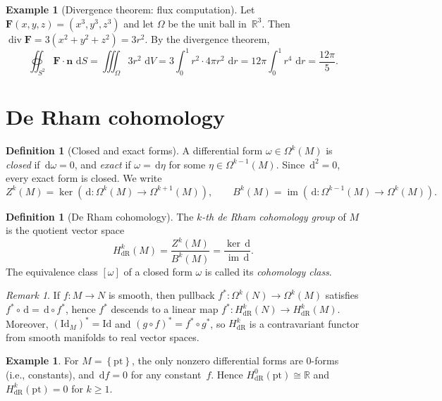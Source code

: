 \documentclass[12pt,a4paper,openany]{book}
\theoremstyle{definition}
\newtheorem{definition}[theorem]{Definition}
\newtheorem{example}[theorem]{Example}
\theoremstyle{remark}
\newtheorem{remark}[theorem]{Remark}
\newcommand{\R}{\mathbb{R}}
\newcommand{\Id}{\mathrm{Id}}
\DeclareMathOperator{\im}{im}
\newcommand{\dd}{\,\mathrm{d}}
\newcommand{\set}[1]{\left\{ #1 \right\}}
\begin{document}
\begin{example}[Divergence theorem: flux computation]\label{ex:divergence-flux}
Let $\mathbf{F}(x,y,z) = (x^3, y^3, z^3)$ and let $\Omega$ be the unit
ball in~$\R^3$.  Then $\operatorname{div}\mathbf{F} = 3(x^2+y^2+z^2) = 3r^2$.
By the divergence theorem,
\[
  \oiint_{S^2}\mathbf{F}\cdot\mathbf{n}\,\dd S
  = \iiint_\Omega 3r^2\,\dd V
  = 3\int_0^1 r^2\cdot 4\pi r^2\,\dd r
  = 12\pi\int_0^1 r^4\,\dd r = \frac{12\pi}{5}.
\]
\end{example}

\section{De Rham cohomology}\label{sec:derham}

\begin{definition}[Closed and exact forms]\label{def:closed-exact}
A differential form $\omega\in\Omega^k(M)$ is \emph{closed} if
$\dd\omega = 0$, and \emph{exact} if $\omega = \dd\eta$ for some
$\eta\in\Omega^{k-1}(M)$.  Since $\dd^2 = 0$, every exact form is
closed.  We write
\[
  Z^k(M) = \ker(\dd\colon\Omega^k(M)\to\Omega^{k+1}(M)),\qquad
  B^k(M) = \im(\dd\colon\Omega^{k-1}(M)\to\Omega^k(M)).
\]
\end{definition}

\begin{definition}[De Rham cohomology]\label{def:derham-cohomology}
The \emph{$k$-th de Rham cohomology group} of $M$ is the quotient
vector space
\[
  H^k_{\mathrm{dR}}(M) = \frac{Z^k(M)}{B^k(M)}
  = \frac{\ker\dd}{\im\dd}.
\]
The equivalence class $[\omega]$ of a closed form $\omega$ is called
its \emph{cohomology class}.
\end{definition}

\begin{remark}\label{rem:derham-functor}
If $f\colon M\to N$ is smooth, then pullback $f^*\colon\Omega^k(N)\to\Omega^k(M)$
satisfies $f^*\circ\dd = \dd\circ f^*$, hence $f^*$ descends to a
linear map $f^*\colon H^k_{\mathrm{dR}}(N)\to H^k_{\mathrm{dR}}(M)$.
Moreover, $(\Id_M)^* = \Id$ and $(g\circ f)^* = f^*\circ g^*$, so
$H^k_{\mathrm{dR}}$ is a contravariant functor from smooth manifolds
to real vector spaces.
\end{remark}

\begin{example}\label{ex:derham-point}
For $M = \set{\mathrm{pt}}$, the only nonzero differential forms are
$0$-forms (i.e., constants), and $\dd f = 0$ for any constant~$f$.
Hence $H^0_{\mathrm{dR}}(\mathrm{pt}) \cong \R$ and
$H^k_{\mathrm{dR}}(\mathrm{pt}) = 0$ for $k\ge 1$.
\end{example}
\end{document}
